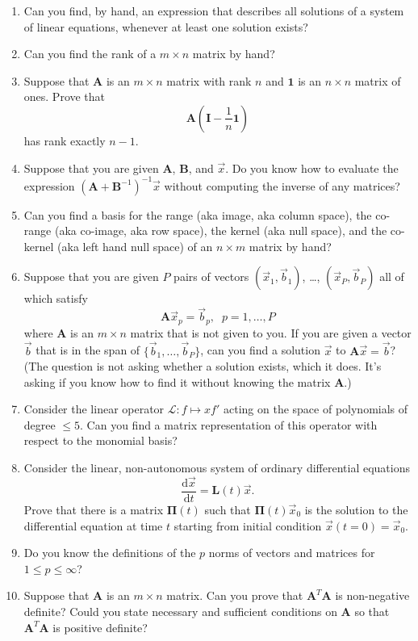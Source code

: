 \documentclass[11pt,fleqn]{article}
\newcommand{\mat}[1]{\mathbf{#1}}
\begin{document}
\begin{enumerate}
\item Can you find, by hand, an expression that describes all solutions of a system of linear equations, whenever at least one solution exists?
\item Can you find the rank of a $m\times n$ matrix by hand?
\item Suppose that $\mat{A}$ is an $m\times n$ matrix with rank $n$ and $\mat{1}$ is an $n\times n$ matrix of ones. Prove that $$\mat{A}\left(\mat{I} - \frac{1}{n}\mat{1}\right)$$ has rank exactly $n-1$. 
\item Suppose that you are given $\mat{A}$, $\mat{B}$, and $\vec{x}$. Do you know how to evaluate the expression $(\mathbf{A}+\mathbf{B}^{-1})^{-1}\vec{x}$ without computing the inverse of any matrices?
\item Can you find a basis for the range (aka image, aka column space), the co-range (aka co-image, aka row space), the kernel (aka null space), and the co-kernel (aka left hand null space) of an $n\times m$ matrix by hand?
\item Suppose that you are given $P$ pairs of vectors $(\vec{x}_1,\vec{b}_1)$, \ldots, $(\vec{x}_P,\vec{b}_P)$ all of which satisfy
\[\mathbf{A}\vec{x}_p = \vec{b}_p,\;\;p=1,\ldots,P\]
where $\mathbf{A}$ is an $m\times n$ matrix that is not given to you. If you are given a vector $\vec{b}$ that is in the span of $\{\vec{b}_1,\ldots,\vec{b}_P\}$, can you find a solution $\vec{x}$ to $\mathbf{A}\vec{x} = \vec{b}$? (The question is not asking whether a solution exists, which it does. It's asking if you know how to find it without knowing the matrix $\mathbf{A}$.)
\item Consider the linear operator $\mathcal{L}: f\mapsto x f'$ acting on the space of polynomials of degree $\le 5$. Can you find a matrix representation of this operator with respect to the monomial basis?
\item Consider the linear, non-autonomous system of ordinary differential equations
\[\frac{\mathrm{d}\vec{x}}{\mathrm{d}t} = \mat{L}(t)\vec{x}.\]
Prove that there is a matrix $\bm{\Pi}(t)$ such that $\bm{\Pi}(t)\vec{x}_0$ is the solution to the differential equation at time $t$ starting from initial condition $\vec{x}(t=0) = \vec{x}_0$.
\item Do you know the definitions of the $p$ norms of vectors and matrices for $1\le p \le \infty$?
\item Suppose that $\mat{A}$ is an $m\times n$ matrix. Can you prove that $\mat{A}^T\mat{A}$ is non-negative definite? Could you state necessary and sufficient conditions on $\mat{A}$ so that $\mat{A}^T\mat{A}$ is positive definite?

\end{enumerate}
\end{document}
